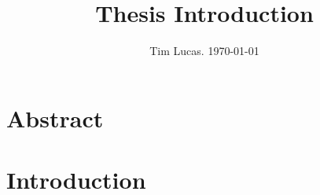 \documentclass[a4paper,10pt,reqno]{amsart}
\renewcommand{\tableofcontents}{}
\begin{document}
\title{Thesis Introduction}
\author{Tim Lucas. \today}
\date{}

\maketitle

\section{Abstract}



\section{Introduction}






\small
\printbibliography 
\end{document}
